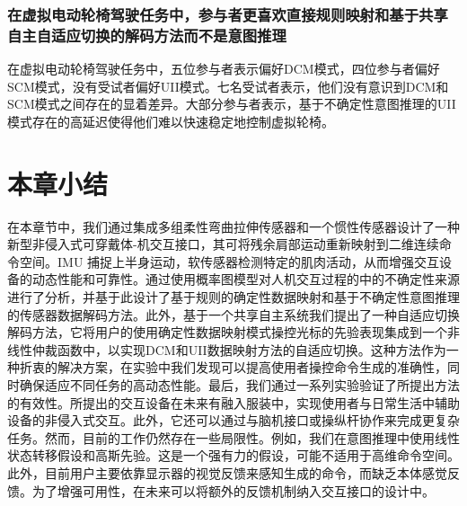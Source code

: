 \subsubsection{在虚拟电动轮椅驾驶任务中，参与者更喜欢直接规则映射和基于共享自主自适应切换的解码方法而不是意图推理}在虚拟电动轮椅驾驶任务中，五位参与者表示偏好DCM模式，四位参与者偏好SCM模式，没有受试者偏好UII模式。七名受试者表示，他们没有意识到DCM和SCM模式之间存在的显着差异。大部分参与者表示，基于不确定性意图推理的UII模式存在的高延迟使得他们难以快速稳定地控制虚拟轮椅。

\section{本章小结}在本章节中，我们通过集成多组柔性弯曲拉伸传感器和一个惯性传感器设计了一种新型非侵入式可穿戴体-机交互接口，其可将残余肩部运动重新映射到二维连续命令空间。IMU 捕捉上半身运动，软传感器检测特定的肌肉活动，从而增强交互设备的动态性能和可靠性。通过使用概率图模型对人机交互过程的中的不确定性来源进行了分析，并基于此设计了基于规则的确定性数据映射和基于不确定性意图推理的传感器数据解码方法。此外，基于一个共享自主系统我们提出了一种自适应切换解码方法，它将用户的使用确定性数据映射模式操控光标的先验表现集成到一个非线性仲裁函数中，以实现DCM和UII数据映射方法的自适应切换。这种方法作为一种折衷的解决方案，在实验中我们发现可以提高使用者操控命令生成的准确性，同时确保适应不同任务的高动态性能。最后，我们通过一系列实验验证了所提出方法的有效性。所提出的交互设备在未来有融入服装中，实现使用者与日常生活中辅助设备的非侵入式交互。此外，它还可以通过与脑机接口或操纵杆协作来完成更复杂任务。然而，目前的工作仍然存在一些局限性。例如，我们在意图推理中使用线性状态转移假设和高斯先验。这是一个强有力的假设，可能不适用于高维命令空间。此外，目前用户主要依靠显示器的视觉反馈来感知生成的命令，而缺乏本体感觉反馈。为了增强可用性，在未来可以将额外的反馈机制纳入交互接口的设计中。
